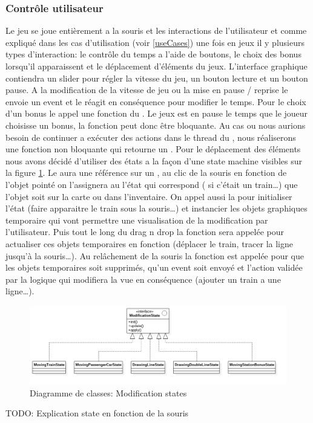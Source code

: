 \documentclass[report, backcover, french, nodocumentinfo]{upmethodology-document}
\begin{document}
			\subsubsection{Contrôle utilisateur}
				Le jeu se joue entièrement a la souris et les interactions de l'utilisateur et comme expliqué dans les cas d'utilisation (voir \ref{useCases}) une fois en jeux il y plusieurs types d'interaction: le contrôle du temps a l'aide de boutons, le choix des bonus lorsqu'il apparaissent et le déplacement d'éléments du jeux.
					L'interface graphique contiendra un slider pour régler la vitesse du jeu, un bouton lecture et un bouton pause. A la modification de la vitesse de jeu ou la mise en pause / reprise le  envoie un event et le  réagit en conséquence pour modifier le temps.
					Pour le choix d'un bonus le  appel une fonction du . Le jeux est en pause le temps que le joueur choisisse un bonus, la fonction peut donc être bloquante. Au cas ou nous aurions besoin de continuer a exécuter des actions dans le thread du , nous réaliserons une fonction non bloquante qui retourne un .
					Pour le déplacement des éléments nous avons décidé d'utiliser des états a la façon d'une state machine visibles sur la figure \ref{fig:ModificationStatesClassDiagram}. Le  aura une référence sur un , au clic de la souris en fonction de l'objet pointé on l'assignera au l'état qui correspond ( si c'était un train\ldots) que l'objet soit sur la carte ou dans l'inventaire. On appel aussi la  pour initialiser l'état (faire apparaitre le train sous la souris\ldots) et instancier les objets graphiques temporaire qui vont permettre une visualisation de la modification par l'utilisateur. Puis tout le long du drag n drop la fonction  sera appelée pour actualiser ces objets temporaires en fonction (déplacer le train, tracer la ligne jusqu’à la souris\ldots). Au relâchement de la souris la fonction  est appelée pour que les objets temporaires soit supprimés, qu'un event soit envoyé et l'action validée par la logique qui modifiera la vue en conséquence (ajouter un train a une ligne\ldots).
					\begin{figure}[h!]
						\centering
						\includegraphics[width=\textwidth]{figures/ModificationStatesClassDiagram.png}
						\caption{Diagramme de classes: Modification states}
						\label{fig:ModificationStatesClassDiagram}
					\end{figure}
					TODO: Explication state en fonction de la souris
\end{document}
